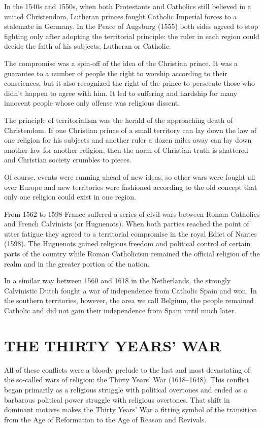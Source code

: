 In the 1540s and 1550s, when both Protestants and Catholics still believed in a united Christendom,
Lutheran princes fought Catholic Imperial forces to a stalemate in Germany. In the Peace of Augsburg
(1555) both sides agreed to stop fighting only after adopting the territorial principle: the ruler
in each region could decide the faith of his subjects, Lutheran or Catholic.

The compromise was a spin-off of the idea of the Christian prince. It was a guarantee to a number of
people the right to worship according to their consciences, but it also recognized the right of the
prince to persecute those who didn’t happen to agree with him. It led to suffering and hardship for
many innocent people whose only offense was religious dissent.

The principle of territorialism was the herald of the approaching death of Christendom. If one
Christian prince of a small territory can lay down the law of one religion for his subjects and
another ruler a dozen miles away can lay down another law for another religion, then the norm of
Christian truth is shattered and Christian society crumbles to pieces.

Of course, events were running ahead of new ideas, so other wars were fought all over Europe and new
territories were fashioned according to the old concept that only one religion could exist in one
region.

From 1562 to 1598 France suffered a series of civil wars between Roman Catholics and French
Calvinists (or Huguenots). When both parties reached the point of utter fatigue they agreed to a
territorial compromise in the royal Edict of Nantes (1598). The Huguenots gained religious freedom
and political control of certain parts of the country while Roman Catholicism remained the official
religion of the realm and in the greater portion of the nation.

In a similar way between 1560 and 1618 in the Netherlands, the strongly Calvinistic Dutch fought a
war of independence from Catholic Spain and won. In the southern territories, however, the area we
call Belgium, the people remained Catholic and did not gain their independence from Spain until much
later.

\section{THE THIRTY YEARS’ WAR}

All of these conflicts were a bloody prelude to the last and most devastating of the so-called wars
of religion: the Thirty Years’ War (1618–1648). This conflict began primarily as a religious
struggle with political overtones and ended as a barbarous political power struggle with religious
overtones. That shift in dominant motives makes the Thirty Years’ War a fitting symbol of the
transition from the Age of Reformation to the Age of Reason and Revivals.

